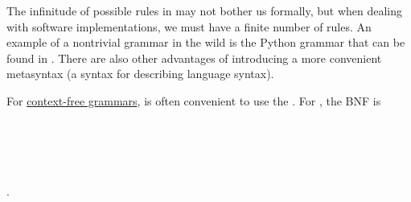 \begin{remark}\label{rem:backus_naur_form}
  The infinitude of possible rules in  may not bother us formally, but when dealing with software implementations, we must have a finite number of rules. An example of a nontrivial grammar in the wild is the Python grammar that can be found in \cite{Python39Grammar}. There are also other advantages of introducing a more convenient metasyntax (a syntax for describing language syntax).

  For \hyperref[def:chomsky_hierarchy/context_free]{context-free grammars}, is often convenient to use the . For , the BNF is
  \begin{bnf*}
     { \bnfor {} \bnfor {} \bnfor {} \bnfor {} \bnfor {} \bnfor {} \bnfor {} \bnfor {}} \\
             { \bnfor {}} \\
            { \bnfor {} \bnfsp {}} \\
         {\bnfts{\( \times \)} \bnfor \bnfts{\( \div \)}} \\
        { \bnfor \bnfts{(} \bnfsp {} \bnfsp {} \bnfsp {} \bnfsp \bnfts{)}}.
  \end{bnf*}


\end{remark}
